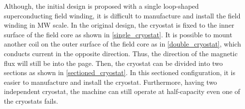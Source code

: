 \documentclass[12pt]{iopart}
\begin{document}
Although, the initial design is proposed with a single loop-shaped superconducting field winding, it is difficult to manufacture and install the field winding in MW scale. In the original design, the cryostat is fixed to the inner surface of the field core as shown in \ref{single_cryostat}. It is possible to mount another coil on the outer surface of the field core as in \ref{double_cryostat}, which conducts current in the opposite direction. Thus, the direction of the magnetic flux will still be into the page. Then, the cryostat can be divided into two sections as shown in \ref{sectioned_cryostat}. In this sectioned configuration, it is easier to manufacture and install the cryostat. Furthermore, having two independent cryostat, the machine can still operate at half-capacity even one of the cryostats fails. 
\begin{figure}[]
  \centering
    \hfill
   \hfill 

\end{figure}
\end{document}
